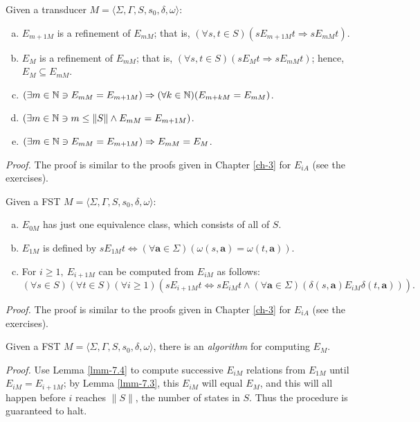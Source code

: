 \begin{lmm}\label{lmm-7.3}
Given a transducer $M=\langle\Sigma,\Gamma,S,s_0,\delta,\omega\rangle$:
\begin{enumerate}[a.]
\item $E_{m+1M}$ is a refinement of $E_{mM}$; that is, $(\forall s,t \in S)
	(s E_{m+1M} t \Rightarrow s E_{mM} t)$.
\item $E_M$ is a refinement of $E_{mM}$; that is, $(\forall s,t \in S)(s E_M t
	\Rightarrow s E_{mM} t)$; hence, $E_M \subseteq E_{mM}$.
\item $(\exists m \in \mathbb{N} \ni E_{mM} = E_{m+1M}) \Rightarrow (\forall k \in \mathbb{N})
	(E_{m+kM} = E_{mM})$.
\item $(\exists m \in \mathbb{N} \ni m \leq \|S\| \wedge E_{mM} = E_{m+1M})$.
\item $(\exists m \in \mathbb{N} \ni E_{mM} = E_{m+1M}) \Rightarrow E_{mM} = E_M$.
\end{enumerate}

\emph{Proof.} The proof is similar to the proofs given in Chapter \ref{ch-3} for $E_{iA}$
(see the exercises).
\end{lmm}

\begin{lmm}\label{lmm-7.4}
Given a FST $M=\langle\Sigma,\Gamma,S,s_0,\delta,\omega\rangle$:
\begin{enumerate}[a.]
\item  $E_{0M}$ has just one equivalence class, which consists of all of $S$.
\item $E_{1M}$ is defined by $s E_{1M} t \Leftrightarrow (\forall \pmb{a} \in
\Sigma)(\omega(s,\pmb{a})=\omega(t,\pmb{a}))$.
\item For $i \geq 1,\ E_{i+1M}$ can be computed from $E_{iM}$ as follows:
\[ (\forall s \in S)(\forall t \in S)(\forall i \geq 1)(s E_{i+1M} t
	\Leftrightarrow s E_{iM} t \wedge (\forall \pmb{a} \in \Sigma)(\delta(s,
	\pmb{a})E_{iM}\delta(t,\pmb{a}))). \]
\end{enumerate}
\emph{Proof.} The proof is similar to the proofs given in Chapter \ref{ch-3} for $E_{iA}$
(see the exercises).
\end{lmm}

\begin{cor}\label{cor-7.6}
Given a FST $M=\langle\Sigma,\Gamma,S,s_0,\delta,\omega\rangle$, there is an
\emph{algorithm} for computing $E_M$.

\emph{Proof.} Use Lemma \ref{lmm-7.4} to compute successive $E_{iM}$ relations from
$E_{1M}$ until $E_{iM}=E_{i+1M}$; by Lemma \ref{lmm-7.3}, this $E_{iM}$ will equal $E_M$,
and this will all happen before $i$ reaches $\|S\|$, the number of states in
$S$. Thus the procedure is guaranteed to halt.
\end{cor}

